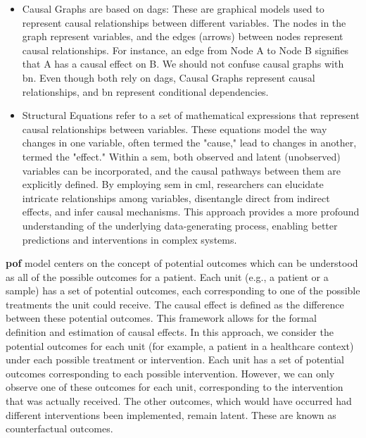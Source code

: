 \begin{itemize}
    \item Causal Graphs are based on \acp{dag}: These are graphical models used to represent causal relationships between different variables. The nodes in the graph represent variables, and the edges (arrows) between nodes represent causal relationships. For instance, an edge from Node A to Node B signifies that A has a causal effect on B. We should not confuse causal graphs with \ac{bn}. Even though both rely on \acp{dag}, Causal Graphs represent causal relationships, and \ac{bn} represent conditional dependencies.
\item Structural Equations refer to a set of mathematical expressions that represent causal relationships between variables. These equations model the way changes in one variable, often termed the "cause," lead to changes in another, termed the "effect." Within a \ac{sem}, both observed and latent (unobserved) variables can be incorporated, and the causal pathways between them are explicitly defined. By employing \ac{sem} in \ac{cml}, researchers can elucidate intricate relationships among variables, disentangle direct from indirect effects, and infer causal mechanisms. This approach provides a more profound understanding of the underlying data-generating process, enabling better predictions and interventions in complex systems.

\end{itemize}

\textbf{\Ac{pof}} model centers on the concept of potential outcomes which can be understood as all of the possible outcomes for a patient.  Each unit (e.g., a patient or a sample) has a set of potential outcomes, each corresponding to one of the possible treatments the unit could receive. The causal effect is defined as the difference between these potential outcomes. This framework allows for the formal definition and estimation of causal effects. In this approach, we consider the potential outcomes for each unit (for example, a patient in a healthcare context) under each possible treatment or intervention. Each unit has a set of potential outcomes corresponding to each possible intervention. However, we can only observe one of these outcomes for each unit, corresponding to the intervention that was actually received. The other outcomes, which would have occurred had different interventions been implemented, remain latent. These are known as counterfactual outcomes.

